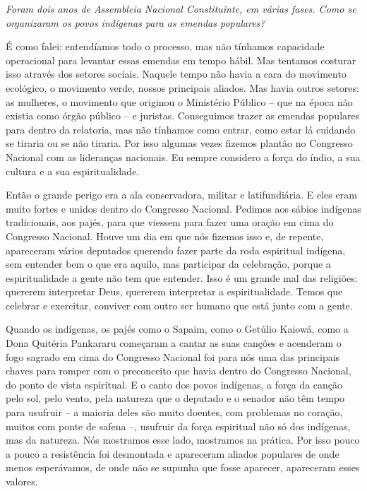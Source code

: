 \medskip

\noindent\emph{Foram dois anos de Assembleia Nacional Constituinte, em várias
fases. Como se organizaram os povos indígenas para as emendas
populares?}

É como falei: entendíamos todo o processo, mas não
tínhamos capacidade operacional para levantar essas emendas em tempo
hábil. Mas tentamos costurar isso através dos setores sociais. Naquele
tempo não havia a cara do movimento ecológico, o movimento verde, nossos
principais aliados. Mas havia outros setores: as mulheres, o movimento
que originou o Ministério Público -- que na época não existia como órgão
público -- e juristas. Conseguimos trazer as emendas populares para
dentro da relatoria, mas não tínhamos como entrar, como estar lá
cuidando se tiraria ou se não tiraria. Por isso algumas vezes fizemos
plantão no Congresso Nacional com as lideranças nacionais. Eu sempre
considero a força do índio, a sua cultura e a sua espiritualidade.

Então o grande perigo era a ala conservadora, militar e latifundiária. E
eles eram muito fortes e unidos dentro do Congresso Nacional. Pedimos
aos sábios indígenas tradicionais, aos pajés, para que viessem para
fazer uma oração em cima do Congresso Nacional. Houve um dia em que nós
fizemos isso e, de repente, apareceram vários deputados querendo fazer
parte da roda espiritual indígena, sem entender bem o que era aquilo,
mas participar da celebração, porque a espiritualidade a gente não tem
que entender. Isso é um grande mal das religiões: quererem interpretar
Deus, quererem interpretar a espiritualidade. Temos que celebrar e
exercitar, conviver com outro ser humano que está junto com a gente.

Quando os indígenas, os pajés como o Sapaim, como o Getúlio Kaiowá, como
a Dona Quitéria Pankararu começaram a cantar as suas canções e acenderam
o fogo sagrado em cima do Congresso Nacional foi para nós uma das
principais chaves para romper com o preconceito que havia dentro do
Congresso Nacional, do ponto de vista espiritual. E o canto dos povos
indígenas, a força da canção pelo sol, pelo vento, pela natureza que o
deputado e o senador não têm tempo para usufruir -- a maioria deles são
muito doentes, com problemas no coração, muitos com ponte de safena --,
usufruir da força espiritual não só dos indígenas, mas da natureza. Nós
mostramos esse lado, mostramos na prática. Por isso pouco a pouco a
resistência foi desmontada e apareceram aliados populares de onde menos
esperávamos, de onde não se supunha que fosse aparecer, apareceram esses
valores.

